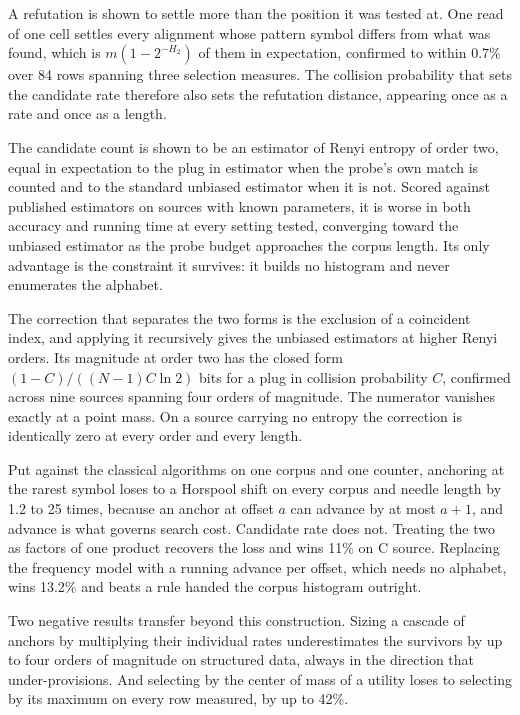 A refutation is shown to settle more than the position it was tested at. One read of one cell settles every alignment whose pattern symbol differs from what was found, which is \(m(1-2^{-H_2})\) of them in expectation, confirmed to within 0.7\% over 84 rows spanning three selection measures. The collision probability that sets the candidate rate therefore also sets the refutation distance, appearing once as a rate and once as a length.

The candidate count is shown to be an estimator of Renyi entropy of order two, equal in expectation to the plug in estimator when the probe's own match is counted and to the standard unbiased estimator when it is not. Scored against published estimators on sources with known parameters, it is worse in both accuracy and running time at every setting tested, converging toward the unbiased estimator as the probe budget approaches the corpus length. Its only advantage is the constraint it survives: it builds no histogram and never enumerates the alphabet.

The correction that separates the two forms is the exclusion of a coincident index, and applying it recursively gives the unbiased estimators at higher Renyi orders. Its magnitude at order two has the closed form \((1-C)/((N-1)C\ln 2)\) bits for a plug in collision probability \(C\), confirmed across nine sources spanning four orders of magnitude. The numerator vanishes exactly at a point mass. On a source carrying no entropy the correction is identically zero at every order and every length.

Put against the classical algorithms on one corpus and one counter, anchoring at the rarest symbol loses to a Horspool shift on every corpus and needle length by 1.2 to 25 times, because an anchor at offset \(a\) can advance by at most \(a+1\), and advance is what governs search cost. Candidate rate does not. Treating the two as factors of one product recovers the loss and wins 11\% on C source. Replacing the frequency model with a running advance per offset, which needs no alphabet, wins 13.2\% and beats a rule handed the corpus histogram outright.

Two negative results transfer beyond this construction. Sizing a cascade of anchors by multiplying their individual rates underestimates the survivors by up to four orders of magnitude on structured data, always in the direction that under-provisions. And selecting by the center of mass of a utility loses to selecting by its maximum on every row measured, by up to 42\%.

